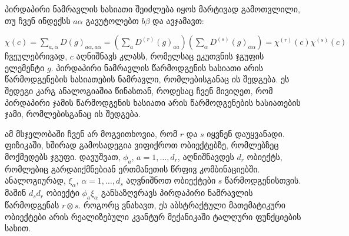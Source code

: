\documentclass[12pt]{article}
\begin{document}
\begin{sloppypar}
პირდაპირი ნამრავლის ხასიათი შეიძლება იყოს მარტივად გამოთვლილი, თუ ჩვენ ინდექსს $a\alpha$ გავუტოლებთ $b\beta$ და ავჯამავთ:

$
\chi(c) = \sum_{a,\alpha}D(g)_{a\alpha,a\alpha}= (\sum_aD^{(r)}(g)_{aa})(\sum_{\alpha}D^{(s)}(g)_{\alpha\alpha}) = \chi^{(r)}(c)\chi^{(s)}(c)
$
ჩვეულებრივად, $c$ აღნიშნავს კლასს, რომელსაც ეკუთვნის ჯგუფის ელემენტი $g$. პირდაპირი ნამრავლის წარმოდგენის ხასიათი არის წარმოდგენების ხასიათების ნამრავლი, რომლებისგანაც ის შედგება. ეს შედეგი კარგ ანალოგიაშია წინასთან, როდესაც ჩვენ მივიღეთ, რომ პირდაპირი ჯამის წარმოდგენის ხასიათი არის წარმოდგენების ხასიათების ჯამი, რომლებისგანაც ის შედგება.

ამ მსჯელობაში ჩვენ არ მოგვითხოვია, რომ $r$ და $s$ იყვნენ დაუყვანადი.\\

ფიზიკაში, ხშირად გამოსადეგია ვიფიქროთ ობიექტებზე, რომლებზეც მოქმედებს ჯგუფი. დავუშვათ, $\phi_a$, $a = 1,\dots,d_r$, აღნიშნავდეს $d_r$ ობიექტს, რომლებიც გარდაიქმნებიან ერთმანეთის წრფივ კომბინაციებში. ანალოგიურად, $\xi_{\alpha}$, $\alpha = 1,\dots,d_s$ აღვნიშნოთ ობიექტები $s$ წარმოდგენისთვის. მაშინ $d_sd_r$ ობიექტი $\phi_a\xi_{\alpha}$ განსაზღვრავს პირდაპირი ნამრავლის წარმოდგენას $r \otimes s$. როგორც ვნახავთ, ეს აბსტრაქტული მათემატიკური ობიექტები არის რეალიზებული კვანტურ მექანიკაში ტალღური ფუნქციების სახით.








\end{sloppypar}
\end{document}
